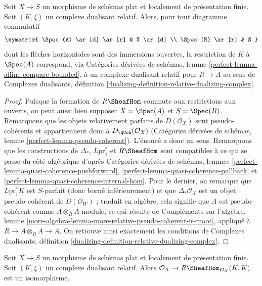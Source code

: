 \begin{lemma}
\label{lemma-relative-dualizing-complex-algebra}
Soit $X \to S$ un morphisme de schémas plat et localement de présentation finie. Soit $(K, \xi)$ un complexe dualisant relatif. Alors, pour tout diagramme commutatif
$$
\xymatrix{
\Spec(A) \ar[d] \ar[r] & X \ar[d] \\
\Spec(R) \ar[r] & S
}
$$
dont les flèches horizontales sont des immersions ouvertes, la restriction de $K$ à $\Spec(A)$ correspond, via Catégories dérivées de schémas, lemme \ref{perfect-lemma-affine-compare-bounded}, à un complexe dualisant relatif pour $R \to A$ au sens de Complexes dualisants, définition \ref{dualizing-definition-relative-dualizing-complex}.
\end{lemma}

\begin{proof}
Puisque la formation de $R\SheafHom$ commute aux restrictions aux ouverts, on peut aussi bien supposer $X = \Spec(A)$ et $S = \Spec(R)$. Remarquons que les objets relativement parfaits de $D(\mathcal{O}_X)$ sont pseudo-cohérents et appartiennent donc à $D_\QCoh(\mathcal{O}_X)$ (Catégories dérivées de schémas, lemme \ref{perfect-lemma-pseudo-coherent}). L'énoncé a donc un sens. Remarquons que les constructions de $\Delta_*$, $L\text{pr}_1^*$ et $R\SheafHom$ sont compatibles à ce qui se passe du côté algébrique d'après Catégories dérivées de schémas, lemmes \ref{perfect-lemma-quasi-coherence-pushforward}, \ref{perfect-lemma-quasi-coherence-pullback} et \ref{perfect-lemma-quasi-coherence-internal-hom}. Pour le dernier, on remarque que $L\text{pr}_1^*K$ est $S$-parfait (donc borné inférieurement) et que $\Delta_*\mathcal{O}_X$ est un objet pseudo-cohérent de $D(\mathcal{O}_W)$ ; traduit en algèbre, cela signifie que $A$ est pseudo-cohérent comme $A \otimes_R A$-module, ce qui résulte de Compléments sur l'algèbre, lemme \ref{more-algebra-lemma-more-relative-pseudo-coherent-is-moot}, appliqué à $R \to A \otimes_R A \to A$. On retrouve ainsi exactement les conditions de Complexes dualisants, définition \ref{dualizing-definition-relative-dualizing-complex}.
\end{proof}

\begin{lemma}
\label{lemma-relative-dualizing-RHom}
Soit $X \to S$ un morphisme de schémas plat et localement de présentation finie. Soit $(K, \xi)$ un complexe dualisant relatif. Alors
$\mathcal{O}_X \to R\SheafHom_{\mathcal{O}_X}(K, K)$
est un isomorphisme.
\end{lemma}

